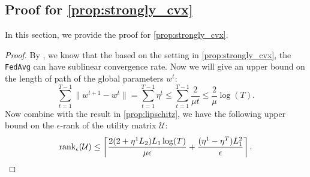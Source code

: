 \subsection{Proof for \autoref{prop:strongly_cvx}}
In this section, we provide the proof for \autoref{prop:strongly_cvx}. 
\begin{proof}
 By \cite[Theorem~1]{li2019convergence}, we know that the based on the setting in \autoref{prop:strongly_cvx}, the \texttt{FedAvg} can have sublinear convergence rate. Now we will give an upper bound on the length of path of the global parameters $w^t$: 
 \[\sum_{t=1}^{T-1} \|w^{t+1} - w^t\| = \sum_{t=1}^{T-1} \eta^t \leq \sum_{t=1}^{T-1} \frac{2}{\mu t} \leq \frac{2}{\mu} \log(T).\]
 Now combine with the result in \autoref{prop:lipschitz}, we have the following upper bound on the $\epsilon$-rank of the utility matrix $\mathcal{U}$:
 \[\operatorname{rank}_{\epsilon}(\mathcal{U}) \leq \left\lceil \frac{2(2+\eta^1L_2) L_1 \log(T)}{\mu\epsilon} +  \frac{(\eta^1 - \eta^T)L_1^2}{\epsilon} \right\rceil.\]
\end{proof}

